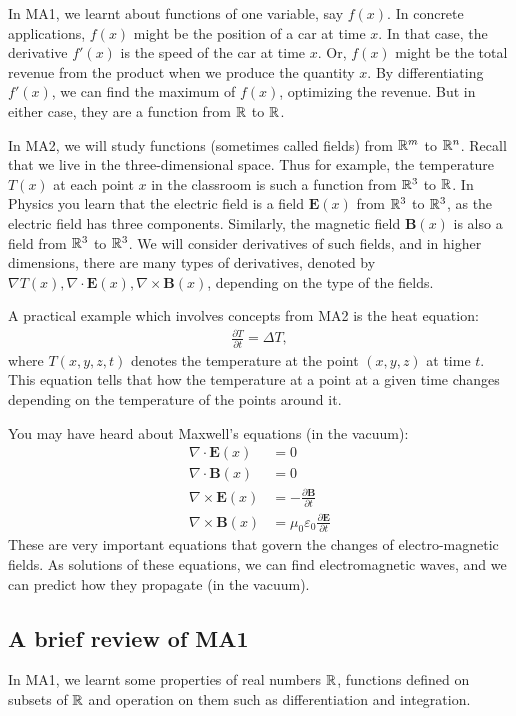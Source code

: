In MA1, we learnt about functions of one variable, say $f(x)$.
In concrete applications, $f(x)$ might be the position of a car at time $x$. In that case, the derivative $f'(x)$ is
the speed of the car at time $x$. Or, $f(x)$ might be the total revenue from the product when we produce the quantity $x$.
By differentiating $f'(x)$, we can find the maximum of $f(x)$, optimizing the revenue.
But in either case, they are a function from $\mathbb{R}$ to $\mathbb{R}$.

In MA2, we will study functions (sometimes called fields) from $\mathbb{R}^m$ to $\mathbb{R}^n$.
Recall that we live in the three-dimensional space. Thus for example,
the temperature $T(x)$ at each point $x$ in the classroom is such a function from $\mathbb{R}^3$ to $\mathbb{R}$.
In Physics you learn that the electric field is a field $\mathbf{E}(x)$ from $\mathbb{R}^3$ to $\mathbb{R}^3$,
as the electric field has three components. Similarly, the magnetic field $\mathbf{B}(x)$ is also a field from $\mathbb{R}^3$ to $\mathbb{R}^3$.
We will consider derivatives of such fields, and in higher dimensions, there are many types of derivatives,
denoted by $\nabla T(x), \nabla \cdot \mathbf{E}(x), \nabla \times \mathbf{B}(x)$, depending on the type of the fields.

A practical example which involves concepts from MA2 is the heat equation:
\begin{align*}
 \frac{\partial T}{\partial t} = \Delta T,
\end{align*}
where $T(x,y,z,t)$ denotes the temperature at the point $(x,y,z)$ at time $t$.
This equation tells that how the temperature at a point at a given time changes depending on the temperature
of the points around it.

You may have heard about Maxwell's equations (in the vacuum):
\begin{align*}
 \nabla \cdot \mathbf{E}(x) &= 0 \\
 \nabla \cdot \mathbf{B}(x) &= 0 \\
 \nabla \times \mathbf{E}(x) &= -\frac{\partial \mathbf{B}}{\partial t} \\
 \nabla \times \mathbf{B}(x) &= \mu_0\varepsilon_0 \frac{\partial \mathbf{E}}{\partial t}
\end{align*}
These are very important equations that govern the changes of electro-magnetic fields.
As solutions of these equations, we can find electromagnetic waves, and we can predict how they propagate (in the vacuum).


\subsection*{A brief review of MA1}
In MA1, we learnt some properties of real numbers $\mathbb{R}$, functions defined on subsets of $\mathbb{R}$
and operation on them such as differentiation and integration.

